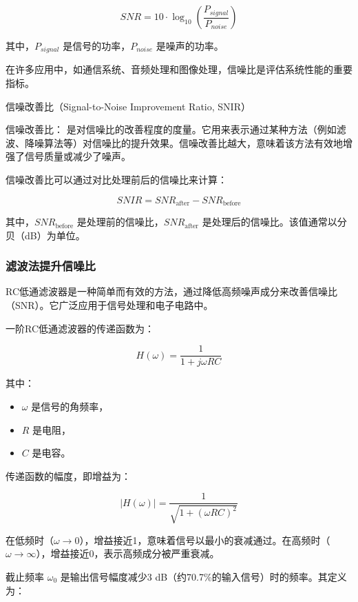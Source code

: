 \documentclass[dvipsnames, svgnames,a4paper,11pt]{article}
\begin{document}
\[
SNR = 10 \cdot \log_{10} \left( \frac{P_{signal}}{P_{noise}} \right)
\]

其中，\(P_{signal}\) 是信号的功率，\(P_{noise}\) 是噪声的功率。

在许多应用中，如通信系统、音频处理和图像处理，信噪比是评估系统性能的重要指标。

信噪改善比（Signal-to-Noise Improvement Ratio, SNIR）

信噪改善比： 是对信噪比的改善程度的度量。它用来表示通过某种方法（例如滤波、降噪算法等）对信噪比的提升效果。信噪改善比越大，意味着该方法有效地增强了信号质量或减少了噪声。

信噪改善比可以通过对比处理前后的信噪比来计算：

\[
SNIR = SNR_{\text{after}} - SNR_{\text{before}}
\]

其中，\(SNR_{\text{before}}\) 是处理前的信噪比，\(SNR_{\text{after}}\) 是处理后的信噪比。该值通常以分贝（dB）为单位。


\subsubsection{滤波法提升信噪比}

RC低通滤波器是一种简单而有效的方法，通过降低高频噪声成分来改善信噪比（SNR）。它广泛应用于信号处理和电子电路中。


一阶RC低通滤波器的传递函数为：

\begin{equation}
H(\omega) = \frac{1}{1 + j\omega RC}
\end{equation}

其中：
\begin{itemize}
    \item \( \omega \) 是信号的角频率，
    \item \( R \) 是电阻，
    \item \( C \) 是电容。
\end{itemize}

传递函数的幅度，即增益为：

\begin{equation}
|H(\omega)| = \frac{1}{\sqrt{1 + (\omega RC)^2}}
\end{equation}

在低频时（\( \omega \rightarrow 0 \)），增益接近1，意味着信号以最小的衰减通过。在高频时（\( \omega \rightarrow \infty \)），增益接近0，表示高频成分被严重衰减。

截止频率 \( \omega_0 \) 是输出信号幅度减少3 dB（约70.7\%的输入信号）时的频率。其定义为：
\end{document}
